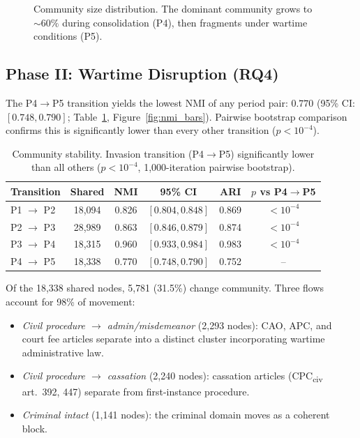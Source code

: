 \documentclass[11pt]{article}
\begin{document}
\begin{figure}[t]
\centering

\caption{Community size distribution. The dominant community grows to ${\sim}60\%$ during consolidation (P4), then fragments under wartime conditions (P5).}
\label{fig:comm_sizes}
\end{figure}

\subsection{Phase II: Wartime Disruption (RQ4)}

The P4$\to$P5 transition yields the lowest NMI of any period pair: $0.770$ (95\% CI: $[0.748, 0.790]$; Table~\ref{tab:nmi}, Figure~\ref{fig:nmi_bars}).
Pairwise bootstrap comparison confirms this is significantly lower than every other transition ($p < 10^{-4}$).

\begin{table}[t]
\centering
\small
\caption{Community stability. Invasion transition (P4$\to$P5) significantly lower than all others ($p < 10^{-4}$, 1{,}000-iteration pairwise bootstrap).}
\label{tab:nmi}
\begin{tabular}{@{}lccccc@{}}
\toprule
\textbf{Transition} & \textbf{Shared} & \textbf{NMI} & \textbf{95\% CI} & \textbf{ARI} & $p$ \textbf{vs P4$\to$P5} \\
\midrule
P1 $\to$ P2 & 18,094 & 0.826 & $[0.804, 0.848]$ & 0.869 & $< 10^{-4}$ \\
P2 $\to$ P3 & 28,989 & 0.863 & $[0.846, 0.879]$ & 0.874 & $< 10^{-4}$ \\
P3 $\to$ P4 & 18,315 & 0.960 & $[0.933, 0.984]$ & 0.983 & $< 10^{-4}$ \\
P4 $\to$ P5 & 18,338 & 0.770 & $[0.748, 0.790]$ & 0.752 & -- \\
\bottomrule
\end{tabular}
\end{table}

Of the 18{,}338 shared nodes, 5{,}781 (31.5\%) change community.
Three flows account for 98\% of movement:
\begin{itemize}[nosep]
  \item \emph{Civil procedure $\to$ admin/misdemeanor} (2{,}293 nodes): CAO, APC, and court fee articles separate into a distinct cluster incorporating wartime administrative law.
  \item \emph{Civil procedure $\to$ cassation} (2{,}240 nodes): cassation articles (CPC\textsubscript{civ} art.~392, 447) separate from first-instance procedure.
  \item \emph{Criminal intact} (1{,}141 nodes): the criminal domain moves as a coherent block.
\end{itemize}
\end{document}
